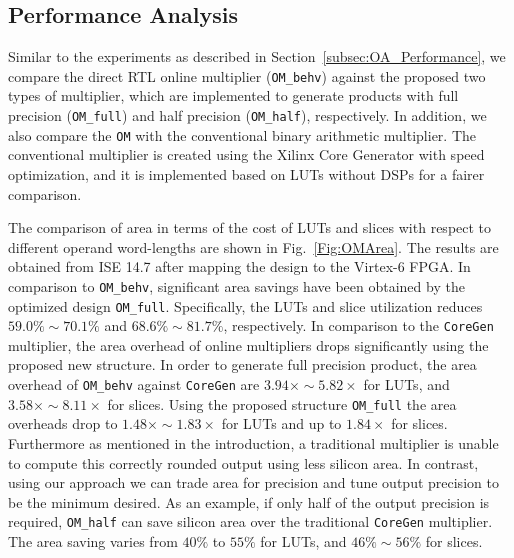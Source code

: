 \documentclass[conference]{IEEEtran}
\begin{document}
\subsection{Performance Analysis}
Similar to the experiments as described in Section~\ref{subsec:OA_Performance}, we compare the direct RTL online multiplier (\texttt{OM\_behv}) against the proposed two types of multiplier, which are implemented to generate products with full precision (\texttt{OM\_full}) and half precision (\texttt{OM\_half}), respectively. In addition, we also compare the \texttt{OM} with the conventional binary arithmetic multiplier. The conventional multiplier is created using the Xilinx Core Generator with speed optimization, and it is implemented based on LUTs without DSPs for a fairer comparison.

The comparison of area in terms of the cost of LUTs and slices with respect to different operand word-lengths are shown in Fig.~\ref{Fig:OMArea}. The results are obtained from ISE 14.7 after mapping the design to the Virtex-6 FPGA. In comparison to \texttt{OM\_behv}, significant area savings have been obtained by the optimized design \texttt{OM\_full}. Specifically, the LUTs and slice utilization reduces $59.0\%\sim70.1\%$ and $68.6\%\sim81.7\%$, respectively. In comparison to the \texttt{CoreGen} multiplier, the area overhead of online multipliers drops significantly using the proposed new structure. In order to generate full precision product, the area overhead of \texttt{OM\_behv} against \texttt{CoreGen} are $3.94\times\sim5.82\times$ for LUTs, and $3.58\times\sim8.11\times$ for slices. Using the proposed structure \texttt{OM\_full} the area overheads drop to $1.48\times\sim1.83\times$ for LUTs and up to $1.84\times$ for slices. Furthermore as mentioned in the introduction, a traditional multiplier is unable to compute this correctly rounded output using less silicon area. In contrast, using our approach we can trade area for precision and tune output precision to be the minimum desired. As an example, if only half of the output precision is required, \texttt{OM\_half} can save silicon area over the traditional \texttt{CoreGen} multiplier. The area saving varies from $40\%$ to $55\%$ for LUTs, and $46\%\sim56\%$ for slices.

\end{document}
